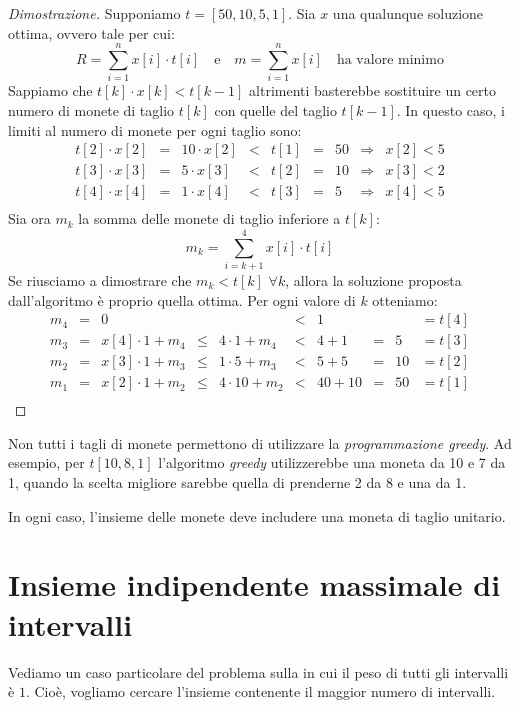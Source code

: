 \begin{proof}[Dimostrazione]
    Supponiamo $t=[50, 10, 5, 1]$. Sia $x$ una qualunque soluzione ottima, ovvero
    tale per cui:
    \[R=\sum_{i=1}^n x[i]\cdot t[i]\quad\text{e}\quad m=\sum_{i=1}^n x[i]\quad
    \text{ha valore minimo}\]
    Sappiamo che $t[k]\cdot x[k]<t[k-1]$ altrimenti basterebbe sostituire un certo
    numero di monete di taglio $t[k]$ con quelle del taglio $t[k-1]$. In questo
    caso, i limiti al numero di monete per ogni taglio sono:
    \[\begin{array}{rclccclcl}
        t[2]\cdot x[2] & = & 10\cdot x[2] & < & t[1] & = & 50 & \Rightarrow & x[2]<5\\
        t[3]\cdot x[3] & = & 5\cdot x[3] & < & t[2] & = & 10 & \Rightarrow & x[3]<2\\
        t[4]\cdot x[4] & = & 1\cdot x[4] & < & t[3] & = & 5 & \Rightarrow & x[4]<5\\
    \end{array}\]
    Sia ora $m_k$ la somma delle monete di taglio inferiore a $t[k]$:
    \[m_k=\sum_{i=k+1}^4 x[i]\cdot t[i]\]
    Se riusciamo a dimostrare che $m_k<t[k]$ $\forall k$, allora la soluzione
    proposta dall'algoritmo è proprio quella ottima. Per ogni valore di $k$
    otteniamo:
    \[\begin{array}{rclclclclc}
        m_4 & = & 0 & & & < & 1 & & & =t[4]\\
        m_3 & = & x[4]\cdot1+m_4 & \leq & 4\cdot 1+m_4 & < & 4+1 & = & 5 & =t[3]\\
        m_2 & = & x[3]\cdot1+m_3 & \leq & 1\cdot 5+m_3 & < & 5+5 & = & 10 & =t[2]\\
        m_1 & = & x[2]\cdot1+m_2 & \leq & 4\cdot 10+m_2 & < & 40+10 & = & 50 & =t[1]\\
    \end{array}\]
\end{proof}
\begin{note}
    Non tutti i tagli di monete permettono di utilizzare la \emph{programmazione
    greedy}. Ad esempio, per $t[10,8,1]$ l'algoritmo \emph{greedy} utilizzerebbe
    una moneta da 10 e 7 da 1, quando la scelta migliore sarebbe quella di
    prenderne 2 da 8 e una da 1.
\end{note}
\begin{note}
    In ogni caso, l'insieme delle monete deve includere una moneta di taglio
    unitario.
\end{note}

\section{Insieme indipendente massimale di intervalli}
Vediamo un caso particolare del problema sulla  in cui il peso
di tutti gli intervalli è $1$. Cioè, vogliamo cercare l'insieme contenente il
maggior numero di intervalli.

